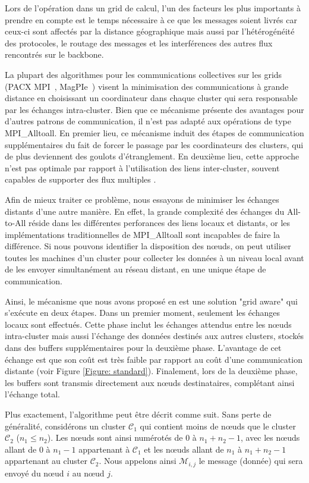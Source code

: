 Lors de l'opération dans un grid de calcul, l'un des facteurs les plus importants à prendre en compte est le temps nécessaire à ce que les messages soient livrés car ceux-ci sont affectés par la distance géographique mais aussi par l'hétérogénéité des protocoles, le routage des messages et les interférences des autres flux rencontrés sur le backbone. 

La plupart des algorithmes pour les communications collectives sur les grids (PACX MPI~\cite{Gabriel98}, MagPIe~\cite{Kielmann01}) visent la minimisation des communications à grande distance en choisissant un coordinateur dans chaque cluster qui sera responsable par les échanges intra-cluster. Bien que ce mécanisme présente des avantages pour d'autres patrons de communication, il n'est pas adapté aux opérations de type  MPI\_Alltoall. En premier lieu, ce mécanisme  induit des étapes de communication supplémentaires du fait de forcer le passage par les coordinateurs des clusters, qui de plus deviennent des goulots d'étranglement. En deuxième lieu, cette approche n'est pas optimale par rapport à l'utilisation des liens inter-cluster, souvent capables de supporter des flux multiples \cite{Casanova05}. 

Afin de mieux traiter ce problème, nous essayons de minimiser les échanges distants d'une autre manière. En effet, la grande complexité des échanges du All-to-All réside dans les différentes perforances des liens locaux et distants, or les implémentations traditionnelles de MPI\_Alltoall sont incapables de faire la différence. Si nous pouvons identifier la disposition des n{\oe}uds, on peut utiliser toutes les machines d'un cluster pour collecter les données à un niveau local avant de les envoyer simultanément au réseau distant, en une unique étape de communication. 

Ainsi, le mécanisme que nous avons proposé en \cite{Steffenel07c} est une solution "grid aware" qui s'exécute en deux étapes. Dans un premier moment, seulement les échanges locaux sont effectués. Cette phase inclut les échanges attendus entre les n{\oe}uds intra-cluster mais aussi l'échange des données destinés aux autres clusters, stockés dans des buffers supplémentaires pour la deuxième phase. L'avantage de cet échange est que son coût est très faible par rapport au coût d'une communication distante (voir Figure \ref{Figure: standard}). Finalement, lors de la deuxième phase, les buffers sont transmis directement aux n{\oe}uds destinataires, complétant ainsi l'échange total.  

Plus exactement, l'algorithme peut être décrit comme suit. Sans perte de généralité, considérons un cluster  ${\mathcal C}_1$ qui contient moins de n{\oe}uds que le cluster ${\mathcal C}_2$ ($n_1\leq n_2$). Les n{\oe}uds sont ainsi numérotés de 0 à $n_1+n_2-1$, avec les n{\oe}uds allant de 0 à $n_1-1$ appartenant à ${\mathcal C}_1$ et les n{\oe}uds allant de $n_1$ à $n_1+n_2-1$ appartenant au cluster ${\mathcal C}_2$. Nous appelons ainsi ${\mathcal M}_{i,j}$ le message (donnée) qui sera envoyé du n{\oe}ud $i$ au n{\oe}ud $j$. 

